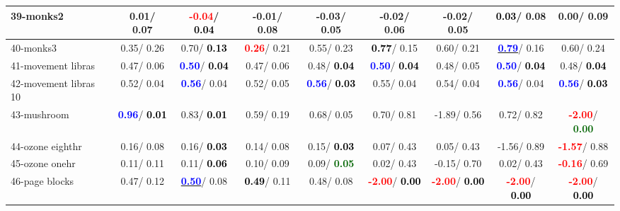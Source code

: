 \begin{table}[h]
\begin{center}
\begin{tabular}{lc|c|c|c|c|c|c|c}
39-monks2 &   0.01/  0.07 & \textcolor{red}{\textbf{ -0.04}}/\textcolor{black}{\textbf{  0.04}} &  -0.01/  0.08 &  -0.03/  0.05 &  -0.02/  0.06 &  -0.02/  0.05 & \textcolor{black}{\textbf{  0.03}}/  0.08 &   0.00/  0.09 \\ \hline
40-monks3 &   0.35/  0.26 &   0.70/\textcolor{black}{\textbf{  0.13}} & \textcolor{red}{\textbf{  0.26}}/  0.21 &   0.55/  0.23 & \textcolor{black}{\textbf{  0.77}}/  0.15 &   0.60/  0.21 & \underline{\textcolor{blue}{\textbf{  0.79}}}/  0.16 &   0.60/  0.24 \\
41-movement libras &   0.47/  0.06 & \textcolor{blue}{\textbf{  0.50}}/\textcolor{black}{\textbf{  0.04}} &   0.47/  0.06 &   0.48/\textcolor{black}{\textbf{  0.04}} & \textcolor{blue}{\textbf{  0.50}}/\textcolor{black}{\textbf{  0.04}} &   0.48/  0.05 & \textcolor{blue}{\textbf{  0.50}}/\textcolor{black}{\textbf{  0.04}} &   0.48/\textcolor{black}{\textbf{  0.04}} \\
42-movement libras 10 &   0.52/  0.04 & \textcolor{blue}{\textbf{  0.56}}/  0.04 &   0.52/  0.05 & \textcolor{blue}{\textbf{  0.56}}/\textcolor{black}{\textbf{  0.03}} &   0.55/  0.04 &   0.54/  0.04 & \textcolor{blue}{\textbf{  0.56}}/  0.04 & \textcolor{blue}{\textbf{  0.56}}/\textcolor{black}{\textbf{  0.03}} \\
43-mushroom & \textcolor{blue}{\textbf{  0.96}}/\textcolor{black}{\textbf{  0.01}} &   0.83/\textcolor{black}{\textbf{  0.01}} &   0.59/  0.19 &   0.68/  0.05 &   0.70/  0.81 &  -1.89/  0.56 &   0.72/  0.82 & \textcolor{red}{\textbf{ -2.00}}/\textcolor{darkgreen}{\textbf{  0.00}} \\
44-ozone eighthr &   0.16/  0.08 &   0.16/\textcolor{black}{\textbf{  0.03}} &   0.14/  0.08 &   0.15/\textcolor{black}{\textbf{  0.03}} &   0.07/  0.43 &   0.05/  0.43 &  -1.56/  0.89 & \textcolor{red}{\textbf{ -1.57}}/  0.88 \\
45-ozone onehr &   0.11/  0.11 &   0.11/\textcolor{black}{\textbf{  0.06}} &   0.10/  0.09 &   0.09/\textcolor{darkgreen}{\textbf{  0.05}} &   0.02/  0.43 &  -0.15/  0.70 &   0.02/  0.43 & \textcolor{red}{\textbf{ -0.16}}/  0.69 \\
46-page blocks &   0.47/  0.12 & \underline{\textcolor{blue}{\textbf{  0.50}}}/  0.08 & \textcolor{black}{\textbf{  0.49}}/  0.11 &   0.48/  0.08 & \textcolor{red}{\textbf{ -2.00}}/\textcolor{black}{\textbf{  0.00}} & \textcolor{red}{\textbf{ -2.00}}/\textcolor{black}{\textbf{  0.00}} & \textcolor{red}{\textbf{ -2.00}}/\textcolor{black}{\textbf{  0.00}} & \textcolor{red}{\textbf{ -2.00}}/\textcolor{black}{\textbf{  0.00}} \\ \hline

\end{tabular}
\end{center}
\end{table}
